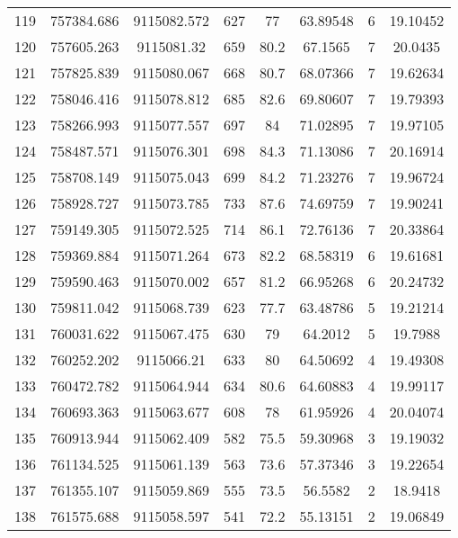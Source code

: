 \begin{longtable}{cccccccc}
119  & 757384.686      & 9115082.572      & 627     & 77    & 63.89548 & 6  & 19.10452 \\
120  & 757605.263      & 9115081.32       & 659     & 80.2  & 67.1565  & 7  & 20.0435  \\
121  & 757825.839      & 9115080.067      & 668     & 80.7  & 68.07366 & 7  & 19.62634 \\
122  & 758046.416      & 9115078.812      & 685     & 82.6  & 69.80607 & 7  & 19.79393 \\
123  & 758266.993      & 9115077.557      & 697     & 84    & 71.02895 & 7  & 19.97105 \\
124  & 758487.571      & 9115076.301      & 698     & 84.3  & 71.13086 & 7  & 20.16914 \\
125  & 758708.149      & 9115075.043      & 699     & 84.2  & 71.23276 & 7  & 19.96724 \\
126  & 758928.727      & 9115073.785      & 733     & 87.6  & 74.69759 & 7  & 19.90241 \\
127  & 759149.305      & 9115072.525      & 714     & 86.1  & 72.76136 & 7  & 20.33864 \\
128  & 759369.884      & 9115071.264      & 673     & 82.2  & 68.58319 & 6  & 19.61681 \\
129  & 759590.463      & 9115070.002      & 657     & 81.2  & 66.95268 & 6  & 20.24732 \\
130  & 759811.042      & 9115068.739      & 623     & 77.7  & 63.48786 & 5  & 19.21214 \\
131  & 760031.622      & 9115067.475      & 630     & 79    & 64.2012  & 5  & 19.7988  \\
132  & 760252.202      & 9115066.21       & 633     & 80    & 64.50692 & 4  & 19.49308 \\
133  & 760472.782      & 9115064.944      & 634     & 80.6  & 64.60883 & 4  & 19.99117 \\
134  & 760693.363      & 9115063.677      & 608     & 78    & 61.95926 & 4  & 20.04074 \\
135  & 760913.944      & 9115062.409      & 582     & 75.5  & 59.30968 & 3  & 19.19032 \\
136  & 761134.525      & 9115061.139      & 563     & 73.6  & 57.37346 & 3  & 19.22654 \\
137  & 761355.107      & 9115059.869      & 555     & 73.5  & 56.5582  & 2  & 18.9418  \\
138  & 761575.688      & 9115058.597      & 541     & 72.2  & 55.13151 & 2  & 19.06849 \\

\end{longtable}
